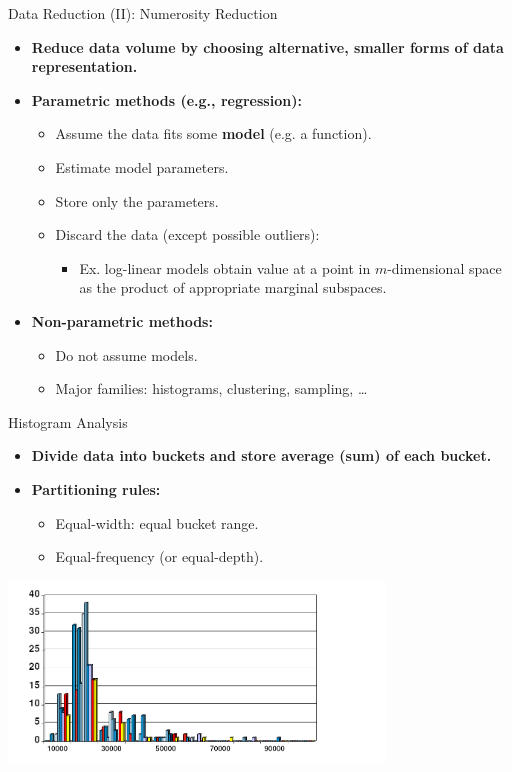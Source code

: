 \begin{frame}{Data Reduction (II): Numerosity Reduction}
	\begin{itemize}
		\item \textbf{Reduce data volume by choosing alternative, 
		{\color{airforceblue}smaller} forms of data representation.}
		\item \textbf{{\color{airforceblue}Parametric} methods (e.g., 
		regression):}
		\begin{itemize}
			\item Assume the data fits some 
			\textbf{{\color{airforceblue}model}} (e.g. a function).
			\item Estimate model parameters.
			\item Store only the parameters.
			\item Discard the data (except possible outliers):
			\begin{itemize}
				\item Ex. log-linear models obtain value at a point in 
				$m$-dimensional space as the product of appropriate marginal 
				subspaces.
			\end{itemize}
		\end{itemize}
		\item \textbf{{\color{airforceblue}Non-parametric} methods:}
		\begin{itemize}
			\item Do not assume models.
			\item Major families: histograms, clustering, sampling, \ldots
		\end{itemize}
	\end{itemize}
\end{frame}

\begin{frame}{Histogram Analysis}
	\begin{itemize}
		\item \textbf{Divide data into buckets and store average (sum) of each 
		bucket.}
		\item \textbf{Partitioning rules:}
		\begin{itemize}
			\item Equal-width: equal bucket range.
			\item Equal-frequency (or equal-depth).
		\end{itemize}
	\end{itemize}
	\centering
	\includegraphics[width=10cm]{img/histogram.png}
\end{frame}


